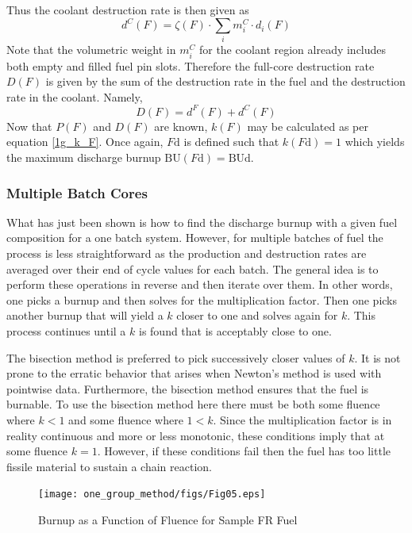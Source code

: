 Thus the coolant destruction rate is then given as
\begin{equation}
\label{1g_dC_F}
d^C(F) = \zeta(F) \cdot \sum_i m_i^C \cdot d_i(F)
\end{equation}
Note that the volumetric weight in $m_i^C$ for the coolant region already includes both 
empty and filled fuel pin slots.  Therefore the full-core destruction rate $D(F)$ is given by 
the sum of the destruction rate in the fuel and the destruction rate in the coolant.  Namely, 
\begin{equation}
\label{1g_D_F}
D(F) = d^F(F) + d^C(F)
\end{equation}
Now that $P(F)$ and $D(F)$ are known, $k(F)$ may be calculated as per equation \ref{1g_k_F}.  
Once again, $F\mbox{d}$ is defined such that $k(F\mbox{d}) = 1$ which yields the maximum discharge 
burnup $\mbox{BU}(F\mbox{d}) = \mbox{BUd}$.




\subsubsection{Multiple Batch Cores}
\label{1g_sec:batch_ave}
What has just been shown is how to find the discharge burnup with a given fuel composition for a one
batch system.  However, for multiple batches of fuel the process is less straightforward as the 
production and destruction rates are averaged over their end of cycle values for each batch.  
The general idea is to perform these operations in reverse and then iterate over them.  
In other words, one picks a burnup and then solves for the multiplication factor.  Then one picks 
another burnup that will yield a $k$ closer to one and solves again for $k$.  This process continues 
until a $k$ is found that is acceptably close to one.  

The bisection method is preferred to pick successively closer values of $k$.  It is not prone to the 
erratic behavior that arises when Newton's method is used with pointwise data.   Furthermore, the 
bisection method ensures that the fuel is burnable.  To use the bisection method here there must 
be both some fluence where $k < 1$ and some fluence where $1 < k$.  Since the multiplication factor 
is in reality continuous and more or less monotonic, these conditions imply that at some fluence $k = 1$.  
However, if these conditions fail then the fuel has too little fissile material to sustain a chain reaction. 

\begin{figure}[htbp]
\caption{Burnup as a Function of Fluence for Sample FR Fuel}
\label{1g_fig05}
\begin{center}
\texttt{[image: one\_group\_method/figs/Fig05.eps]}
\end{center}
\end{figure}

